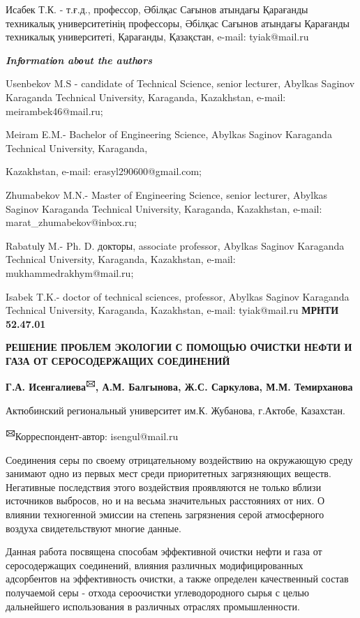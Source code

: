 Исабек Т.К. - т.ғ.д., профессор, Әбілқас Сағынов атындағы Қарағанды
техникалық университетінің профессоры, Әбілқас Сағынов атындағы
Қарағанды техникалық университеті, Қарағанды, Қазақстан, e-mail:
tyiak@mail.ru

\emph{{\bfseries Infоrmatiоn abоut the authоrs}}

Usenbekov M.S - candidate of Technical Science, senior lecturer, Abylkas
Saginov Karaganda Technical University, Karaganda, Kazakhstan, e-mail:
meirambek46@mail.ru;

Meiram E.M.- Bachelor of Engineering Science, Abylkas Saginov Karaganda
Technical University, Karaganda,

Kazakhstan, e-mail: erasyl290600@gmail.com;

Zhumabekov M.N.- Master of Engineering Science, senior lecturer, Abylkas
Saginov Karaganda Technical University, Karaganda, Kazakhstan, e-mail:
marat\_zhumabekov@inbox.ru;

Rabatulу M.- Ph. D. докторы, associate professor, Abylkas Saginov
Karaganda Technical University, Karaganda, Kazakhstan, e-mail:
mukhammedrakhym@mail.ru;

Isabek T.K.- doctor of technical sciences, professor, Abylkas Saginov
Karaganda Technical University, Karaganda, Kazakhstan, e-mail:
tyiak@mail.ru\newpage
{\bfseries МРНТИ 52.47.01}

{\bfseries РЕШЕНИЕ ПРОБЛЕМ ЭКОЛОГИИ С ПОМОЩЬЮ ОЧИСТКИ НЕФТИ И ГАЗА ОТ
СЕРОСОДЕРЖАЩИХ СОЕДИНЕНИЙ}

{\bfseries Г.А. Исенгалиева\textsuperscript{🖂}, А.М. Балгынова, Ж.С.
Саркулова, М.М. Темирханова}

Актюбинский региональный университет им.К. Жубанова, г.Актобе,
Казахстан.

{\bfseries \textsuperscript{🖂}}Корреспондент-автор: isengul@mail.ru

Соединения серы по своему отрицательному воздействию на окружающую среду
занимают одно из первых мест среди приоритетных загрязняющих веществ.
Негативные последствия этого воздействия проявляются не только вблизи
источников выбросов, но и на весьма значительных расстояниях от них. О
влиянии техногенной эмиссии на степень загрязнения серой атмосферного
воздуха свидетельствуют многие данные.

Данная работа посвящена способам эффективной очистки нефти и газа от
серосодержащих соединений, влияния различных модифицированных
адсорбентов на эффективность очистки, а также определен качественный
состав получаемой серы - отхода сероочистки углеводородного сырья с
целью дальнейшего использования в различных отраслях промышленности.

